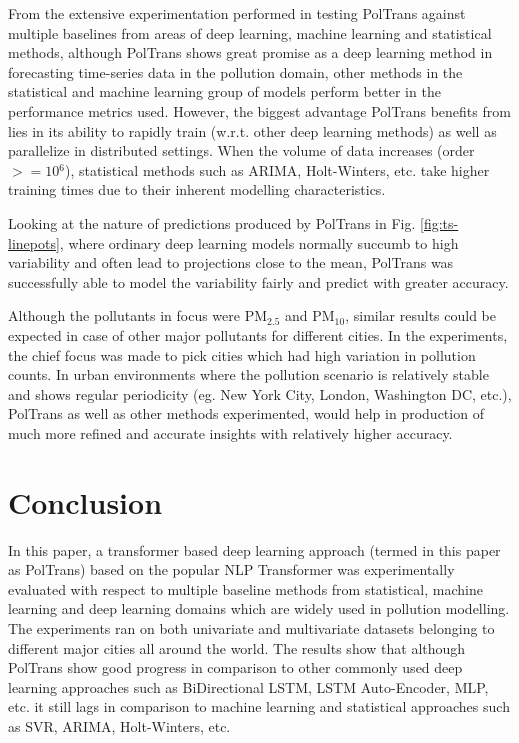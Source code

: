 \documentclass[10pt,journal]{IEEEtran}
\begin{document}
From the extensive experimentation performed in testing {PolTrans} against multiple baselines from areas of deep learning, machine learning and statistical methods, although {PolTrans} shows great promise as a deep learning method in forecasting time-series data in the pollution domain, other methods in the statistical and machine learning group of models perform better in the performance metrics used. However, the biggest advantage {PolTrans} benefits from lies in its ability to rapidly train (w.r.t. other deep learning methods) as well as parallelize in distributed settings. When the volume of data increases (order ${>= 10{^{6}}}$), statistical methods such as ARIMA, Holt-Winters, etc. take higher training times due to their inherent modelling characteristics.

Looking at the nature of predictions produced by {PolTrans} in Fig. \ref{fig:ts-linepots}, where ordinary deep learning models normally succumb to high variability and often lead to projections close to the mean, {PolTrans} was successfully able to model the variability fairly and predict with greater accuracy.

Although the pollutants in focus were PM${_{2.5}}$ and PM${_{10}}$, similar results could be expected in case of other major pollutants for different cities. In the experiments, the chief focus was made to pick cities which had high variation in pollution counts. In urban environments where the pollution scenario is relatively stable and shows regular periodicity (eg. New York City, London, Washington DC, etc.), {PolTrans} as well as other methods experimented, would help in production of much more refined and accurate insights with relatively higher accuracy.

\section{Conclusion}
\label{sec:conclusion}

In this paper, a transformer based deep learning approach (termed in this paper as {PolTrans}) based on the popular NLP Transformer was experimentally evaluated with respect to multiple baseline methods from statistical, machine learning and deep learning domains which are widely used in pollution modelling. The experiments ran on both univariate and multivariate datasets belonging to different major cities all around the world. The results show that although {PolTrans} show good progress in comparison to other commonly used deep learning approaches such as BiDirectional LSTM, LSTM Auto-Encoder, MLP, etc. it still lags in comparison to machine learning and statistical approaches such as SVR, ARIMA, Holt-Winters, etc.
\end{document}
